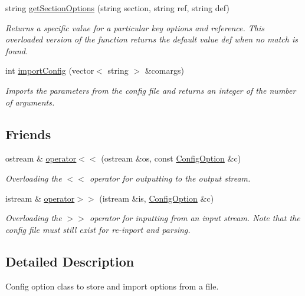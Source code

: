 \begin{DoxyCompactItemize}
string \hyperlink{class_config_option_a9f4884f12f74d865a3370c2f24ffcc67}{get\+Section\+Options} (string section, string ref, string def)
\begin{DoxyCompactList}\small\item\em Returns a specific value for a particular key options and reference. This overloaded version of the function returns the default value def when no match is found. \end{DoxyCompactList}\item 
int \hyperlink{class_config_option_afbd1ed9d006c8ff48d90e63a57f55e2a}{import\+Config} (vector$<$ string $>$ \&comargs)
\begin{DoxyCompactList}\small\item\em Imports the parameters from the config file and returns an integer of the number of arguments. \end{DoxyCompactList}\end{DoxyCompactItemize}
\subsection*{Friends}
\begin{DoxyCompactItemize}
\item 
ostream \& \hyperlink{class_config_option_a9e0cbadb5ac652eb62eb6e046dad5126}{operator$<$$<$} (ostream \&os, const \hyperlink{class_config_option}{Config\+Option} \&c)
\begin{DoxyCompactList}\small\item\em Overloading the $<$$<$ operator for outputting to the output stream. \end{DoxyCompactList}\item 
istream \& \hyperlink{class_config_option_ad418094c35f378a7b92ca5922e45a206}{operator$>$$>$} (istream \&is, \hyperlink{class_config_option}{Config\+Option} \&c)
\begin{DoxyCompactList}\small\item\em Overloading the $>$$>$ operator for inputting from an input stream. Note that the config file must still exist for re-\/inport and parsing. \end{DoxyCompactList}\end{DoxyCompactItemize}


\subsection{Detailed Description}
Config option class to store and import options from a file. 

